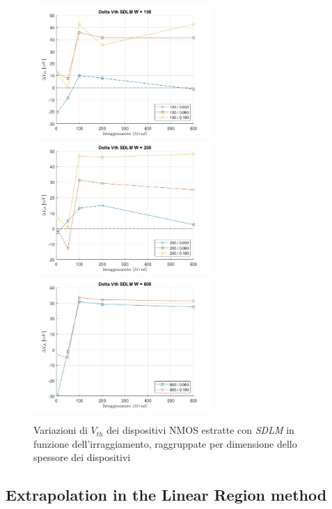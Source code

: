 \documentclass[12pt, letterpaper]{book}
\begin{document}
\begin{figure}[H]
  \centering
  \includegraphics[width=0.6\textwidth]{sovrapposizione-deltaVth-SDLM-N100}
  \includegraphics[width=0.6\textwidth]{sovrapposizione-deltaVth-SDLM-N200}
  \includegraphics[width=0.6\textwidth]{sovrapposizione-deltaVth-SDLM-N600}
  \caption{Variazioni di $V_{th}$ dei dispositivi NMOS estratte con \emph{SDLM} in funzione dell'irraggiamento, raggruppate per dimensione dello spessore dei dispositivi}
\end{figure}








\subsection{Extrapolation in the Linear Region method}
\end{document}
